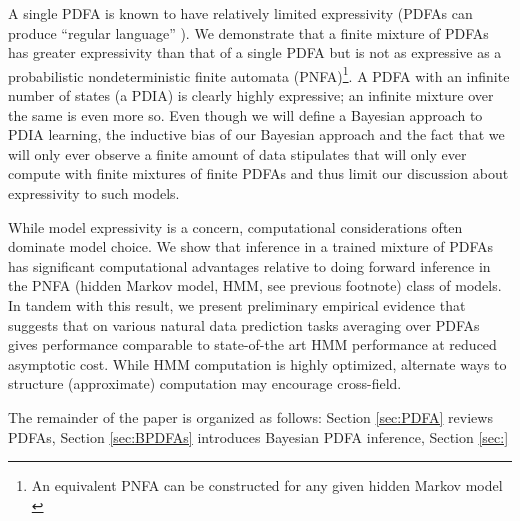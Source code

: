 A single PDFA is known to have relatively limited expressivity (PDFAs can produce ``regular language'' \cite{Dupont2005}).  We demonstrate that a finite mixture of PDFAs has greater expressivity than that of a single PDFA but is not as expressive as a probabilistic nondeterministic finite automata (PNFA)\footnote{An equivalent PNFA can be constructed for any given hidden Markov model \cite{Dupont2005} }.  A PDFA with an infinite number of states (a PDIA) is clearly highly expressive; an infinite mixture over the same is even more so.  Even though we will define a Bayesian approach to PDIA learning, the inductive bias of our Bayesian approach and the fact that we will only ever observe a finite amount of data stipulates that will only ever compute with finite mixtures of finite PDFAs and thus limit our discussion about expressivity to such models.   

While model expressivity is a concern, computational considerations often dominate model choice.  We show that inference in a trained mixture of PDFAs has significant computational advantages relative to doing forward inference in the PNFA (hidden Markov model, HMM, see previous footnote) class of models.   In tandem with this result, we present preliminary empirical evidence that suggests that on various natural data prediction tasks averaging over PDFAs gives performance comparable to state-of-the art HMM performance at reduced asymptotic cost.  While HMM computation is highly optimized, alternate ways to structure (approximate) computation may encourage cross-field.

The remainder of the paper is organized as follows:  Section \ref{sec:PDFA} reviews PDFAs, Section \ref{sec:BPDFAs} introduces Bayesian PDFA inference, Section \ref{sec:}


